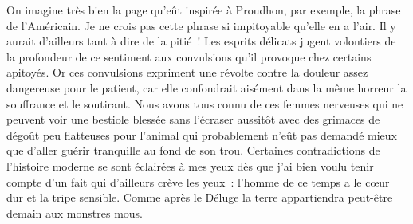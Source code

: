 \documentclass[french,twoside]{book} %
\newcommand{\astertri}{\medskip\par\centerline{\color{rubric}\large\selectfont{\syms ✻\,✻\,✻}}\medskip\par}%
\begin{document}
On imagine très bien la page qu’eût inspirée à Proudhon, par exemple, la phrase de l’Américain. Je ne crois pas cette phrase si impitoyable qu’elle en a l’air. Il y aurait d’ailleurs tant à dire de la pitié ! Les esprits délicats jugent volontiers de la profondeur de ce sentiment aux convulsions qu’il provoque chez certains apitoyés. Or ces convulsions expriment une révolte contre la douleur assez dangereuse pour le patient, car elle confondrait aisément dans la même horreur la souffrance et le soutirant. Nous avons tous connu de ces femmes nerveuses qui ne peuvent voir une bestiole blessée sans l’écraser aussitôt avec des grimaces de dégoût peu flatteuses pour l’animal qui probablement n’eût pas demandé mieux que d’aller guérir tranquille au fond de son trou. Certaines contradictions de l’histoire moderne se sont éclairées à mes yeux dès que j’ai bien voulu tenir compte d’un fait qui d’ailleurs crève les yeux : l’homme de ce temps a le cœur dur et la tripe sensible. Comme après le Déluge la terre appartiendra peut-être demain aux monstres mous.\par

\astertri
\end{document}
